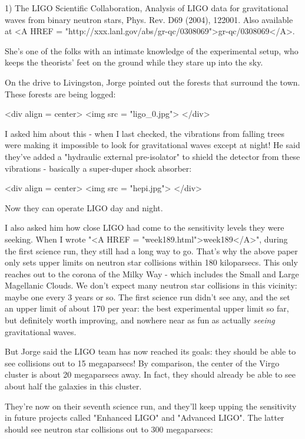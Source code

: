1) The LIGO Scientific Collaboration, Analysis of LIGO data for
gravitational waves from binary neutron stars, Phys. Rev. D69 (2004),
122001.  Also available at <A HREF =
"http://xxx.lanl.gov/abs/gr-qc/0308069">gr-qc/0308069</A>.

She's one of the folks with an intimate knowledge of the experimental 
setup, who keeps the theorists' feet on the ground while they stare 
up into the sky.

On the drive to Livingston, Jorge pointed out the forests that 
surround the town.  These forests are being logged:

<div align = center>
<img src = "ligo_0.jpg">
</div>

I asked him 
about this - when I last checked, the vibrations from falling trees 
were making it impossible to look for gravitational waves except at 
night!  He said they've added a "hydraulic external pre-isolator" to 
shield the detector from these vibrations - basically a super-duper 
shock absorber:

<div align = center>
<img src = "hepi.jpg">
</div>

Now they can operate LIGO day and night.  

I also asked him how close LIGO had come to the sensitivity levels
they were seeking.  When I wrote "<A HREF =
"week189.html">week189</A>", during the first science run, they
still had a long way to go.  That's why the above paper only sets
upper limits on neutron star collisions within 180 kiloparsecs.  This
only reaches out to the corona of the Milky Way - which includes the
Small and Large Magellanic Clouds.  We don't expect many neutron star
collisions in this vicinity: maybe one every 3 years or so.  The first
science run didn't see any, and the set an upper limit of about 170
per year: the best experimental upper limit so far, but definitely
worth improving, and nowhere near as fun as actually \emph{seeing}
gravitational waves.

But Jorge said the LIGO team has now reached its goals: they should be
able to see collisions out to 15 megaparsecs!  By comparison, the
center of the Virgo cluster is about 20 megaparsecs away.  In fact,
they should already be able to see about half the galaxies in this
cluster.

They're now on their seventh
science run, and they'll keep upping the sensitivity in future
projects called "Enhanced LIGO" and "Advanced
LIGO".  The latter should see neutron star collisions out to 300
megaparsecs:

